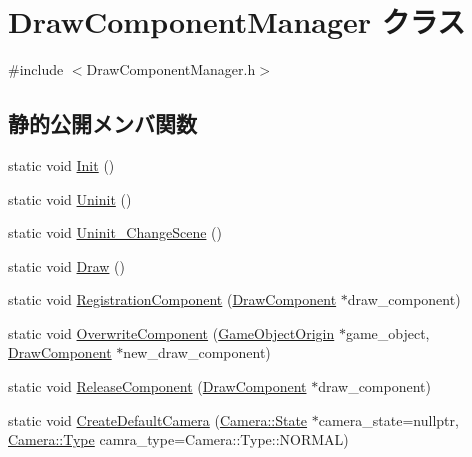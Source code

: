 \hypertarget{class_draw_component_manager}{}\section{Draw\+Component\+Manager クラス}
\label{class_draw_component_manager}


{\ttfamily \#include $<$Draw\+Component\+Manager.\+h$>$}

\subsection*{静的公開メンバ関数}
\begin{DoxyCompactItemize}
\item 
static void \mbox{\hyperlink{class_draw_component_manager_a73e0f46e49bf2f5dcbe96b5227ec99de}{Init}} ()
\item 
static void \mbox{\hyperlink{class_draw_component_manager_ab87a2aa53012607403342b03259571f6}{Uninit}} ()
\item 
static void \mbox{\hyperlink{class_draw_component_manager_a46301f1a8d19b40ace35c8362dadd9e3}{Uninit\+\_\+\+Change\+Scene}} ()
\item 
static void \mbox{\hyperlink{class_draw_component_manager_af851685a13701b040398eb42b2f97c32}{Draw}} ()
\item 
static void \mbox{\hyperlink{class_draw_component_manager_af9d7b699e92f676b6b6004041e69b144}{Registration\+Component}} (\mbox{\hyperlink{class_draw_component}{Draw\+Component}} $\ast$draw\+\_\+component)
\item 
static void \mbox{\hyperlink{class_draw_component_manager_a2a6071bf7d71f6b720c3f13480c963bf}{Overwrite\+Component}} (\mbox{\hyperlink{class_game_object_origin}{Game\+Object\+Origin}} $\ast$game\+\_\+object, \mbox{\hyperlink{class_draw_component}{Draw\+Component}} $\ast$new\+\_\+draw\+\_\+component)
\item 
static void \mbox{\hyperlink{class_draw_component_manager_a87cbaa632ea3c6b699c50ad8b8297313}{Release\+Component}} (\mbox{\hyperlink{class_draw_component}{Draw\+Component}} $\ast$draw\+\_\+component)
\item 
static void \mbox{\hyperlink{class_draw_component_manager_a9885f2a3209de695f7e22223ea381a6e}{Create\+Default\+Camera}} (\mbox{\hyperlink{class_camera_1_1_state}{Camera\+::\+State}} $\ast$camera\+\_\+state=nullptr, \mbox{\hyperlink{class_camera_a3b0a1f58deca679ac665f61c480d1dcb}{Camera\+::\+Type}} camra\+\_\+type=Camera\+::\+Type\+::\+N\+O\+R\+M\+AL)

\end{DoxyCompactItemize}

